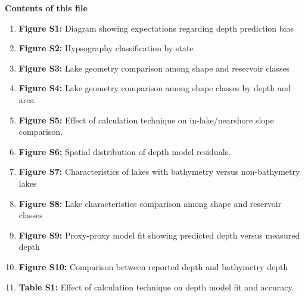 \documentclass[draft,wrr]{agutexSI2019}
\begin{document}
\begin{article}




      \noindent\textbf{Contents of this file}
      \begin{enumerate}

            \item \textbf{Figure S1:} Diagram showing expectations regarding depth prediction bias

            \item \textbf{Figure S2:} Hypsography classification by state

            \item \textbf{Figure S3:} Lake geometry comparison among shape and reservoir classes

            \item \textbf{Figure S4:} Lake geometry comparison among shape classes by depth and area

            \item \textbf{Figure S5:} Effect of calculation technique on in-lake/nearshore slope comparison.

            \item \textbf{Figure S6:} Spatial distribution of depth model residuals.

            \item \textbf{Figure S7:} Characteristics of lakes with bathymetry versus non-bathymetry lakes

            \item \textbf{Figure S8:} Lake characteristics comparison among shape and reservoir classes

            \item \textbf{Figure S9:} Proxy-proxy model fit showing predicted depth versus measured depth

            \item \textbf{Figure S10:} Comparison between reported depth and bathymetry depth

            \item \textbf{Table S1:} Effect of calculation technique on depth model fit and accuracy.

      \end{enumerate}
      \vspace{1em}


\end{article}
\end{document}
